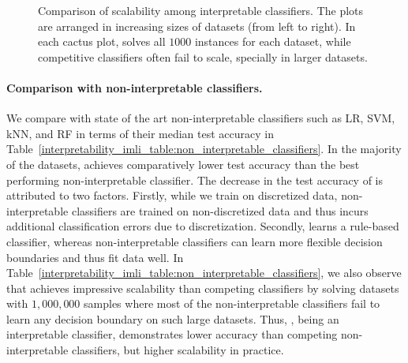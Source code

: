 \begin{figure}
	
	\caption[Scalability of Interpretable Classifiers]{Comparison of scalability among interpretable classifiers. The plots are arranged in increasing sizes of datasets (from left to right). In each cactus plot, {\imli} solves all $ 1000 $ instances for each dataset, while competitive classifiers often fail to scale, specially in larger datasets.}
	\label{interpretability_imli_fig:interpretable_classifiers}
\end{figure}






\paragraph{Comparison with non-interpretable classifiers.} We compare {\imli} with state of the art non-interpretable classifiers such as LR, SVM, kNN, and RF in terms of their median test accuracy in Table~\ref{interpretability_imli_table:non_interpretable_classifiers}. In the majority of the datasets, {\imli} achieves comparatively lower test accuracy than the best performing non-interpretable classifier. The decrease in the test accuracy of {\imli} is attributed to two factors. Firstly, while we train {\imli} on discretized data, non-interpretable classifiers are trained on non-discretized data and thus {\imli} incurs additional classification errors due to discretization. Secondly, {\imli} learns a rule-based classifier, whereas non-interpretable classifiers can learn more flexible decision boundaries and thus fit data well. In Table~\ref{interpretability_imli_table:non_interpretable_classifiers}, we also observe that {\imli} achieves impressive scalability than competing classifiers by solving datasets with $ 1, 000,000 $  samples where most of the non-interpretable classifiers fail to learn any decision boundary on such large datasets. Thus, {\imli}, being an interpretable classifier, demonstrates lower accuracy than competing non-interpretable classifiers, but higher scalability in practice. 


